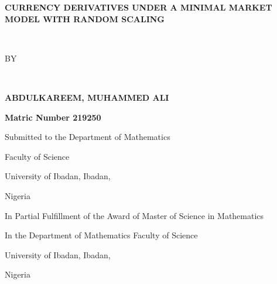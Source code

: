 \documentclass[a4 paper, 12pt]{report}
\theoremstyle{plain}
\begin{document}
	 \baselineskip 29pt
\newcommand{\disp}{\displaystyle}
\thispagestyle{empty}




\begin{center}
	\textbf{\large{CURRENCY DERIVATIVES UNDER A MINIMAL MARKET MODEL WITH RANDOM SCALING}}
\end{center}
\ \
\begin{center}
	
	BY
\end{center}
\ \
\begin{center}
	\textbf{\large{ABDULKAREEM, MUHAMMED ALI}}
\end{center}
\begin{center}
	\textbf{Matric Number 219250}
\end{center}
\begin{center}
	Submitted to the Department of  Mathematics
\end{center}
\begin{center}
	Faculty of Science  
\end{center}
\begin{center}
	University of Ibadan, Ibadan,  
\end{center}
\begin{center}
	Nigeria  
\end{center}
\begin{center}
	In Partial Fulfillment of the Award of Master of Science in Mathematics
\end{center}
\begin{center}
	In the Department of Mathematics Faculty of Science
\end{center}
\begin{center}
	University of Ibadan, Ibadan,  
\end{center}
\begin{center}
	Nigeria  
\end{center}
\end{document}
